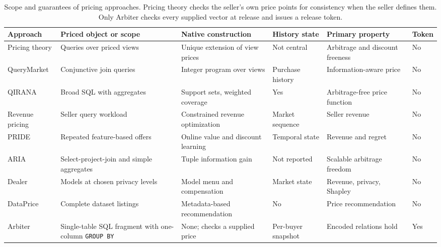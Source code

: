 \documentclass[10pt]{article}
\begin{document}
\begin{table}[h]
\centering
\caption{Scope and guarantees of pricing approaches. Pricing theory checks the seller's own price points for consistency when the seller defines them. Only Arbiter checks every supplied vector at release and issues a release token.}
\label{tab:ext-systems}
\footnotesize
\setlength{\tabcolsep}{3.5pt}
\begin{tabular}{@{}p{2.2cm}p{2.9cm}p{3.0cm}p{2.0cm}p{3.1cm}p{0.9cm}@{}}
\toprule
Approach & Priced object or scope & Native construction & History state & Primary property & Token \\
\midrule
Pricing theory & Queries over priced views & Unique extension of view prices & Not central & Arbitrage and discount freeness & No \\
QueryMarket & Conjunctive join queries & Integer program over views & Purchase history & Information-aware price & No \\
QIRANA & Broad SQL with aggregates & Support sets, weighted coverage & Yes & Arbitrage-free price function & No \\
Revenue pricing & Seller query workload & Constrained revenue optimization & Market sequence & Seller revenue & No \\
PRIDE & Repeated feature-based offers & Online value and discount learning & Temporal state & Revenue and regret & No \\
ARIA & Select-project-join and simple aggregates & Tuple information gain & Not reported & Scalable arbitrage freedom & No \\
Dealer & Models at chosen privacy levels & Model menu and compensation & Market state & Revenue, privacy, Shapley & No \\
DataPrice & Complete dataset listings & Metadata-based recommendation & No & Price recommendation & No \\
Arbiter & Single-table SQL fragment with one-column \texttt{GROUP BY} & None; checks a supplied price & Per-buyer snapshot & Encoded relations hold & Yes \\
\bottomrule
\end{tabular}
\end{table}
\end{document}
